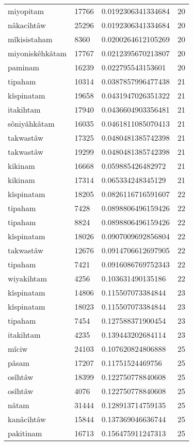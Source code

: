\begin{longtable}{llll}
miyopitam & 17766 & 0.0192306341334684 & 20 \\
nâkacihtâw & 25296 & 0.0192306341334684 & 20 \\
mîkisistaham & 8360 & 0.0200264612105269 & 20 \\
miyoniskêhkâtam & 17767 & 0.0212395670213807 & 20 \\
paminam & 16239 & 0.022795543153601 & 20 \\
tipaham & 10314 & 0.0387857996477438 & 21 \\
kîspinatam & 19658 & 0.0431947026351322 & 21 \\
itakihtam & 17940 & 0.0436604903356481 & 21 \\
sôniyâhkâtam & 16035 & 0.0461811085070413 & 21 \\
takwastâw & 17325 & 0.0480481385742398 & 21 \\
takwastâw & 19299 & 0.0480481385742398 & 21 \\
kikinam & 16668 & 0.059885426482972 & 21 \\
kikinam & 17314 & 0.065334248345129 & 21 \\
kîspinatam & 18205 & 0.0826116716591607 & 22 \\
tipaham & 7428 & 0.0898806496159426 & 22 \\
tipaham & 8824 & 0.0898806496159426 & 22 \\
kîspinatam & 18026 & 0.0907009692856804 & 22 \\
takwastâw & 12676 & 0.0914706612697905 & 22 \\
tipaham & 7421 & 0.0916086769752343 & 22 \\
wiyakihtam & 4256 & 0.103631490135186 & 22 \\
kîspinatam & 14806 & 0.115507073384844 & 23 \\
kîspinatam & 18023 & 0.115507073384844 & 23 \\
tipaham & 7454 & 0.127588371900454 & 23 \\
itakihtam & 4235 & 0.139443202684114 & 23 \\
mîciw & 24103 & 0.107620824806888 & 25 \\
pâsam & 17207 & 0.11751524469756 & 25 \\
osîhtâw & 18399 & 0.122750778840608 & 25 \\
osîhtâw & 4076 & 0.122750778840608 & 25 \\
nâtam & 31444 & 0.128913714759135 & 25 \\
kanâcihtâw & 15844 & 0.137369046636744 & 25 \\
pakitinam & 16713 & 0.156475911247313 & 25 \\

\end{longtable}

